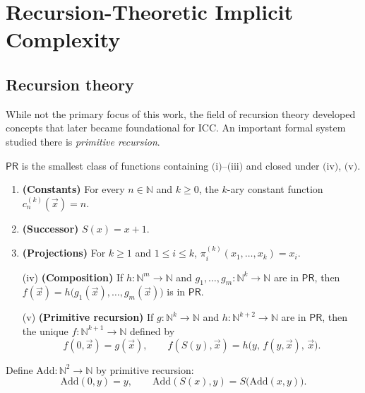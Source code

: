 
\chapter{Recursion-Theoretic Implicit Complexity}
\label{chap:recursion-theory}

\section{Recursion theory}
While not the primary focus of this work, the field of recursion theory developed concepts
that later became foundational for ICC\@. An important formal system studied there is \emph{primitive recursion}.

\begin{definition}
\(\mathsf{PR}\) is the smallest class of functions containing \(\text{(i)}\)--\(\text{(iii)}\) and closed under \(\text{(iv)}\), \(\text{(v)}\).
\begin{enumerate}[label=(\roman*)]
\item \textbf{(Constants)} For every \(n\in\mathbb{N}\) and \(k\ge 0\), the \(k\)-ary constant function
      \(c_{n}^{(k)}(\vec x)=n\).
\item \textbf{(Successor)} \(S(x)=x+1\).
\item \textbf{(Projections)} For \(k\ge 1\) and \(1\le i\le k\),
      \(\pi_i^{(k)}(x_1,\dots,x_k)=x_i\).
\item[(iv)] \textbf{(Composition)} If \(h:\mathbb{N}^m\to\mathbb{N}\) and
      \(g_1,\dots,g_m:\mathbb{N}^k\to\mathbb{N}\) are in \(\mathsf{PR}\), then
      \(f(\vec x)=h\big(g_1(\vec x),\dots,g_m(\vec x)\big)\) is in \(\mathsf{PR}\).
\item[(v)] \textbf{(Primitive recursion)} If \(g:\mathbb{N}^k\to\mathbb{N}\) and
      \(h:\mathbb{N}^{k+2}\to\mathbb{N}\) are in \(\mathsf{PR}\), then the unique
      \(f:\mathbb{N}^{k+1}\to\mathbb{N}\) defined by
      \[
      f(0,\vec x)=g(\vec x),\qquad
      f(S(y),\vec x)=h\big(y,\,f(y,\vec x),\,\vec x\big).
      \]

\end{enumerate}
\end{definition}

\begin{example}[Addition]
Define \(\mathrm{Add}:\mathbb{N}^2\to\mathbb{N}\) by primitive recursion:
\[
\mathrm{Add}(0,y)=y, \qquad
\mathrm{Add}(S(x),y)=S\big(\mathrm{Add}(x,y)\big).
\]
\end{example}


